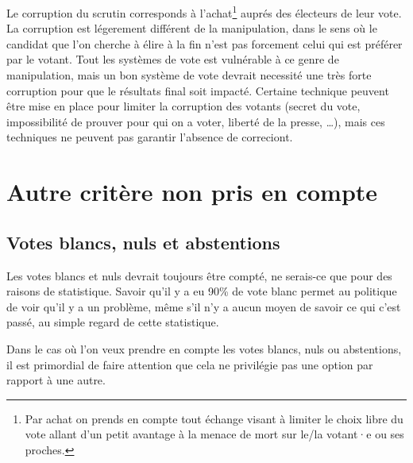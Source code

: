 \documentclass[../report]{subfiles}
\begin{document}

  Le corruption du scrutin corresponds à l'achat\footnote{Par achat on prends en compte 
  tout échange visant à limiter le choix libre du vote allant d'un petit avantage à la menace 
  de mort sur le/la votant·e ou ses proches.} auprés des électeurs de leur vote.
  La corruption est légerement différent de la manipulation, dans le sens où le candidat
  que l'on cherche à élire à la fin n'est pas forcement celui qui est préférer par le votant.
  Tout les systèmes de vote est vulnérable à ce genre de manipulation, mais un bon système de 
  vote devrait necessité une très forte corruption pour que le résultats final soit impacté.
  Certaine technique peuvent être mise en place pour limiter la corruption des votants (secret
  du vote, impossibilité de prouver pour qui on a voter, liberté de la presse, …), mais 
  ces techniques ne peuvent pas garantir l'absence de correciont.
  


  \section{Autre critère non pris en compte}
  \subsection{Votes blancs, nuls et abstentions}

  Les votes blancs et nuls devrait toujours être compté, ne serais-ce que pour des raisons de
  statistique.
  Savoir qu'il y a eu 90\% de vote blanc permet au politique de voir qu'il y a un problème, même
  s'il n'y a aucun moyen de savoir ce qui c'est passé, au simple regard de cette statistique.

  Dans le cas où l'on veux prendre en compte les votes blancs, nuls ou abstentions, il est primordial
  de faire attention que cela ne privilégie pas une option par rapport à une autre.
\end{document}
